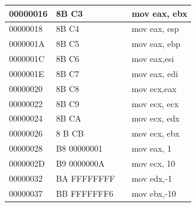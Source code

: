 \documentclass[10pt]{article}
\begin{document}
\begin{center}
\begin{tabular}{|l|l|l|l|}
\hline
00000016 & 8B C3 &  & mov eax, ebx \\
\hline
00000018 & 8B C4 &  & mov eax, esp \\
\hline
0000001A & 8B C5 &  & mov eax, ebp \\
\hline
0000001C & 8B C6 &  & mov eax,esi \\
\hline
0000001E & 8B C7 &  & mov eax, edi \\
\hline
00000020 & 8B C8 &  & mov ecx,eax \\
\hline
00000022 & 8B C9 &  & mov ecx, ecx \\
\hline
00000024 & 8B CA &  & mov ecx, edx \\
\hline
00000026 & 8 B CB &  & mov ecx, ebx \\
\hline
00000028 & B8 00000001 &  & mov eax, 1 \\
\hline
0000002D & B9 0000000A &  & mov ecx, 10 \\
\hline
00000032 & BA FFFFFFFF &  & mov edx,-1 \\
\hline
00000037 & BB FFFFFFF6 &  & mov ebx,-10 \\
\hline
\end{tabular}
\end{center}
\end{document}
